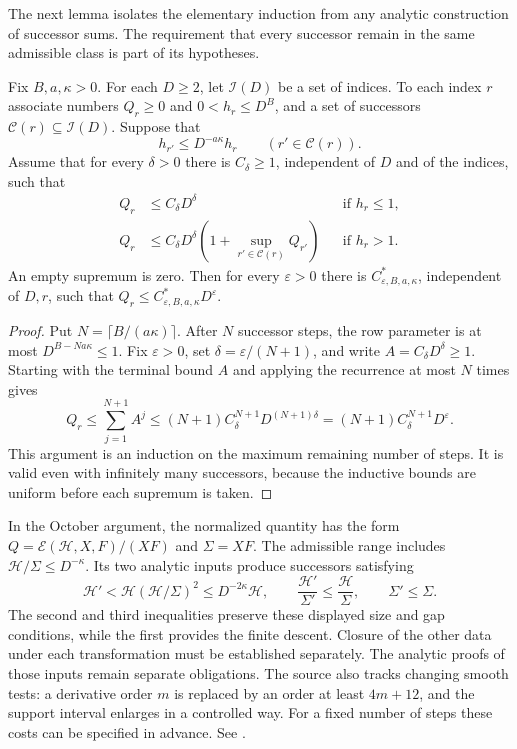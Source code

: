 The next lemma isolates the elementary induction from any analytic
construction of successor sums. The requirement that every successor
remain in the same admissible class is part of its hypotheses.

\begin{lemma}\label{qr-lem-finite-descent}
Fix $B,a,\kappa>0$. For each $D\geq2$, let $\mathcal I(D)$ be a set
of indices. To each index $r$ associate numbers $Q_r\geq0$ and
$0<h_r\leq D^B$, and a set of successors
$\mathcal C(r)\subseteq\mathcal I(D)$. Suppose that
\[
 h_{r'}\leq D^{-a\kappa}h_r\qquad(r'\in\mathcal C(r)).
\]
Assume that for every $\delta>0$ there is $C_\delta\geq1$, independent
of $D$ and of the indices, such that
\begin{align*}
 Q_r&\leq C_\delta D^\delta &&\text{if }h_r\leq1,\\
 Q_r&\leq C_\delta D^\delta
           \left(1+\sup_{r'\in\mathcal C(r)}Q_{r'}\right)
       &&\text{if }h_r>1.
\end{align*}
An empty supremum is zero. Then for every $\varepsilon>0$ there is
$C^*_{\varepsilon,B,a,\kappa}$, independent of $D,r$, such that
$Q_r\leq C^*_{\varepsilon,B,a,\kappa}D^\varepsilon$.
\end{lemma}

\begin{proof}
Put $N=\lceil B/(a\kappa)\rceil$. After $N$ successor steps,
the row parameter is at most $D^{B-Na\kappa}\leq1$.
Fix $\varepsilon>0$, set $\delta=\varepsilon/(N+1)$, and write
$A=C_\delta D^\delta\geq1$. Starting with the terminal bound $A$
and applying the recurrence at most $N$ times gives
\[
 Q_r\leq\sum_{j=1}^{N+1}A^j
      \leq(N+1)C_\delta^{N+1}D^{(N+1)\delta}
      =(N+1)C_\delta^{N+1}D^\varepsilon.
\]
This argument is an induction on the maximum remaining number of
steps. It is valid even with infinitely many successors, because
the inductive bounds are uniform before each supremum is taken.
\end{proof}

In the October argument, the normalized quantity has the form
$Q=\mathcal E(\mathcal H,X,F)/(XF)$ and $\Sigma=XF$. The admissible
range includes $\mathcal H/\Sigma\leq D^{-\kappa}$. Its two analytic
inputs produce successors satisfying
\begin{equation}\label{qr-eq-source-descent}
 \mathcal H'<\mathcal H(\mathcal H/\Sigma)^2
       \leq D^{-2\kappa}\mathcal H,
 \qquad\frac{\mathcal H'}{\Sigma'}\leq
             \frac{\mathcal H}{\Sigma},
 \qquad\Sigma'\leq\Sigma.
\end{equation}
The second and third inequalities preserve these displayed size and gap
conditions, while the first provides the finite descent. Closure of the
other data under each transformation must be established separately. The analytic
proofs of those inputs remain separate obligations. The source
also tracks changing smooth tests: a derivative order $m$ is
replaced by an order at least $4m+12$, and the support interval
enlarges in a controlled way. For a fixed number of steps these
costs can be specified in advance. See
\cite[Section~5]{OpenAIOctober}.

